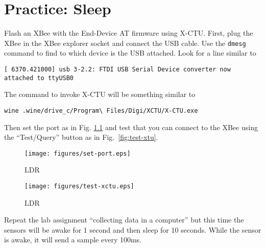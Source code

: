 \chapter{Practice: Sleep}
Flash an XBee with the End-Device AT firmware using X-CTU.
First, plug the XBee in the XBee explorer socket and connect the USB cable.
Use the \texttt{dmesg} command to find to which device is the USB attached.
Look for a line similar to

\texttt{[ 6370.421000] usb 3-2.2: FTDI USB Serial Device converter now attached to ttyUSB0}

The command to invoke X-CTU will be something similar to

\texttt{wine .wine/drive\_c/Program{\textbackslash} Files/Digi/XCTU/X-CTU.exe}

Then set the port as in Fig. \ref{fig:set-port} and test that you can connect to the XBee using the ``Test/Query'' button as in Fig.~\ref{fig:test-xtu}.
\begin{figure}[htbp]
  \centering
  \texttt{[image: figures/set-port.eps]}
  \caption{LDR}
  \label{fig:set-port}
\end{figure}

\begin{figure}[htbp]
  \centering
  \texttt{[image: figures/test-xctu.eps]}
  \caption{LDR}
  \label{fig:test-xctu}
\end{figure}

Repeat the lab assignment ``collecting data in a computer'' but this time the sensors will be awake for 1 second and then sleep for 10 seconds.
While the sensor is awake, it will send a sample every 100ms.
